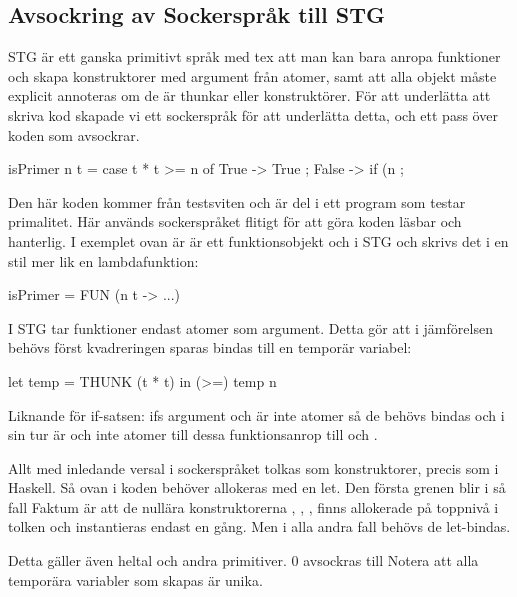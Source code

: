 \documentclass[../Core]{subfiles}
\begin{document}
\subsection{Avsockring av Sockerspråk till STG}
STG är ett ganska primitivt språk med tex att man kan bara anropa funktioner
och skapa konstruktorer med argument från atomer, samt att alla objekt måste
explicit annoteras om de är thunkar eller konstruktörer. För att underlätta
att skriva kod skapade vi ett sockerspråk för att underlätta detta, och ett
pass över koden som avsockrar.

\begin{codeEx}
isPrimer n t = case t * t >= n of
    { True -> True
    ; False -> if (n %
    };
\end{codeEx}

Den här koden kommer från testsviten och är del i ett program som testar
primalitet. Här används sockerspråket flitigt för att göra koden läsbar
och hanterlig. I exemplet ovan är  är ett funktionsobjekt och i 
STG och skrivs det i en stil mer lik en lambdafunktion:

\begin{codeEx}          
isPrimer = FUN (n t -> ...)
\end{codeEx}


I STG tar funktioner endast atomer som argument. Detta gör att 
i jämförelsen  behövs först kvadreringen sparas bindas
till en temporär variabel:

\begin{codeEx}
let temp = THUNK (t * t)
in  (>=) temp n
\end{codeEx}

Liknande för if-satsen: ifs argument  och 
 är inte atomer så de behövs bindas och i
sin tur är  och  inte atomer till dessa 
funktionsanrop till \miniCode{==} och .


Allt med inledande versal i sockerspråket tolkas som konstruktorer,
precis som i Haskell. Så  ovan i koden behöver allokeras med
en let. Den första grenen blir i så fall
Faktum är att de nullära konstruktorerna , , , finns 
allokerade på toppnivå i tolken och instantieras endast en gång. 
Men i alla andra fall behövs de let-bindas.

Detta gäller även heltal och andra primitiver. $0$ avsockras till
Notera att alla temporära variabler som skapas är unika.
            
\end{document}
